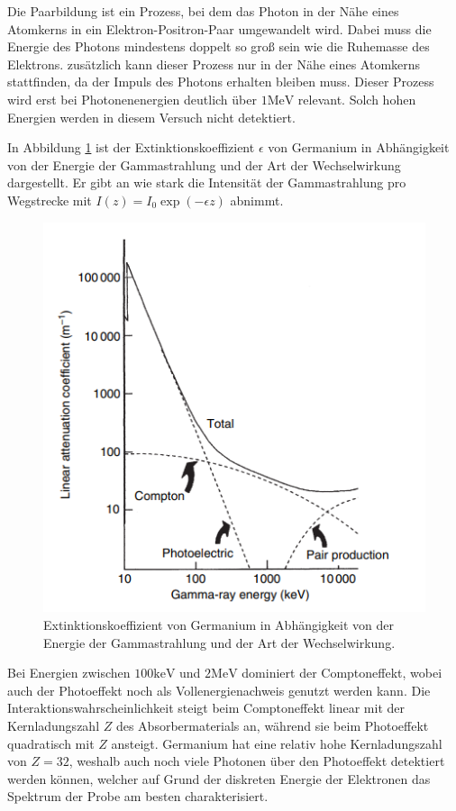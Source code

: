 \noindent Die Paarbildung ist ein Prozess, bei dem das Photon in der Nähe eines Atomkerns in ein Elektron-Positron-Paar umgewandelt wird. Dabei muss die Energie des Photons mindestens doppelt so groß sein wie die Ruhemasse des Elektrons.
zusätzlich kann dieser Prozess nur in der Nähe eines Atomkerns stattfinden, da der Impuls des Photons erhalten bleiben muss. Dieser Prozess wird erst bei Photonenenergien deutlich über $1\si{\mega\electronvolt}$ relevant.
Solch hohen Energien werden in diesem Versuch nicht detektiert.

\noindent In Abbildung \ref{fig:Extinktion} ist der Extinktionskoeffizient $\epsilon$ von Germanium in Abhängigkeit von der Energie der Gammastrahlung und der Art der Wechselwirkung dargestellt.
Er gibt an wie stark die Intensität der Gammastrahlung pro Wegstrecke mit $ I(z)=I_0\exp(-\epsilon z)$ abnimmt.
\begin{figure}[H]
    \centering
    \includegraphics[scale=1.0]{illustration/Extinktionskoeffizient.png}
    \caption{Extinktionskoeffizient von Germanium in Abhängigkeit von der Energie der Gammastrahlung und der Art der Wechselwirkung.\cite{GammaRay}}
    \label{fig:Extinktion}
\end{figure}
\noindent Bei Energien zwischen $100\si{\kilo\electronvolt}$ und $2\si{\mega\electronvolt}$ dominiert der Comptoneffekt, wobei auch der Photoeffekt noch als Vollenergienachweis genutzt werden kann.
Die Interaktionswahrscheinlichkeit steigt beim Comptoneffekt linear mit der Kernladungszahl $Z$ des Absorbermaterials an, während sie beim Photoeffekt quadratisch mit $Z$ ansteigt.
Germanium hat eine relativ hohe Kernladungszahl von $Z=32$, weshalb auch noch viele Photonen über den Photoeffekt detektiert werden können, welcher auf Grund der diskreten 
Energie der Elektronen das Spektrum der Probe am besten charakterisiert. 
